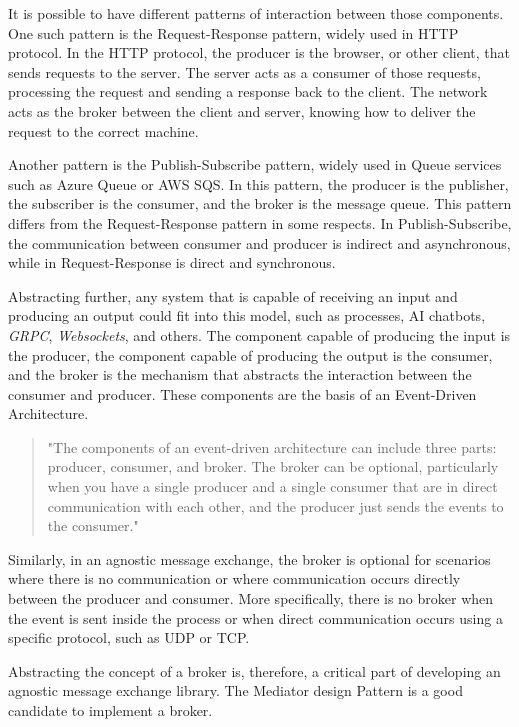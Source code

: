 \documentclass[10pt, conference, a4paper]{IEEEtran}
\begin{document}
It is possible to have different patterns of interaction between those components. 
One such pattern is the Request-Response pattern, widely used in HTTP protocol. In the HTTP protocol, the producer is the browser, or other client, that sends requests to the server. 
The server acts as a consumer of those requests, processing the request and sending a response back to the client. 
The network acts as the broker between the client and server, knowing how to deliver the request to the correct machine.

Another pattern is the Publish-Subscribe pattern, widely used in Queue services such as Azure Queue or AWS SQS. 
In this pattern, the producer is the publisher, the subscriber is the consumer, and the broker is the message queue. 
This pattern differs from the Request-Response pattern in some respects. 
In Publish-Subscribe, the communication between consumer and producer is indirect and asynchronous, while in Request-Response is direct and synchronous.

Abstracting further, any system that is capable of receiving an input and producing an output could fit into this model, such as processes, AI chatbots, \textit{GRPC}, \textit{Websockets}, and others. 
The component capable of producing the input is the producer, the component capable of producing the output is the consumer, and the broker is the mechanism that abstracts the interaction between the consumer and producer. 
These components are the basis of an Event-Driven Architecture.

\begin{quote}
"The components of an event-driven architecture can include three parts: producer, consumer, and broker. 
The broker can be optional, particularly when you have a single producer and a single consumer that are in direct communication with each other, and the producer just sends the events to the consumer."
\end{quote}\parencite{EDA}

Similarly, in an agnostic message exchange, the broker is optional for scenarios where there is no communication or where communication occurs directly between the producer and consumer. 
More specifically, there is no broker when the event is sent inside the process or when direct communication occurs using a specific protocol, such as UDP or TCP. 

Abstracting the concept of a broker is, therefore, a critical part of developing an agnostic message exchange library. 
The Mediator design Pattern is a good candidate to implement a broker.
\end{document}
